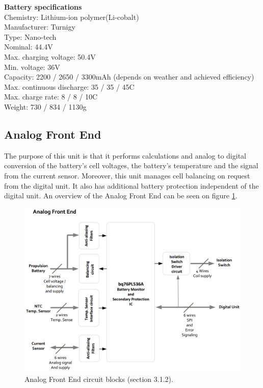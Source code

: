 \textbf{Battery specifications}\\
Chemistry: Lithium-ion polymer(Li-cobalt)\\
Manufacturer: Turnigy\\
Type: Nano-tech\\
Nominal: 44.4V\\
Max. charging voltage: 50.4V\\
Min. voltage: 36V\\
Capacity: 2200 / 2650 / 3300mAh (depends on weather and achieved efficiency)\\
Max. continuous discharge: 35 / 35 / 45C\\
Max. charge rate: 8 / 8 / 10C\\
Weight: 730 / 834 / 1130g\\

\subsection{Analog Front End}
The purpose of this unit is that it performs calculations and analog to digital conversion of the battery's cell voltages, the battery's temperature and the signal from the current sensor. Moreover, this unit manages cell balancing on request from the digital unit. It also has additional battery protection independent of the digital unit.
An overview of the Analog Front End can be seen on figure \ref{fig:frontendOverview}.

\begin{figure}[H]
	\centering
	\includegraphics[width=1.0\linewidth]{Hardware/Pictures/analogfrontendOverview}
	\caption[Empty]{Analog Front End circuit blocks \cite{BMSDocumentation} (section 3.1.2).}
	\label{fig:frontendOverview}
\end{figure}

